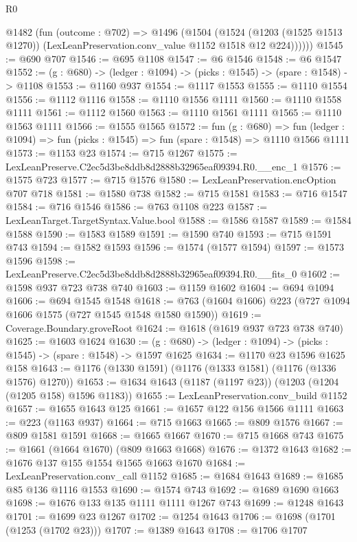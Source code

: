 \begin{lexlean}{R0}
\begin{coremodule}
      @1482
        (fun (outcome : @702) =>
        @1496
          (@1504
            (@1524
              (@1203 (@1525 @1513 @1270))
              (LexLeanPreservation.conv_value @1152 @1518 @12 @224))))))
@1545 := @690 @707
@1546 := @695 @1108
@1547 := @6 @1546
@1548 := @6 @1547
@1552 := (g : @680) -> (ledger : @1094) -> (picks : @1545) -> (spare : @1548) -> @1108
@1553 := @1160 @937
@1554 := @1117 @1553
@1555 := @1110 @1554
@1556 := @1112 @1116
@1558 := @1110 @1556 @1111
@1560 := @1110 @1558 @1111
@1561 := @1112 @1560
@1563 := @1110 @1561 @1111
@1565 := @1110 @1563 @1111
@1566 := @1555 @1565
@1572 := fun (g : @680) =>
  fun (ledger : @1094) => fun (picks : @1545) => fun (spare : @1548) => @1110 @1566 @1111
@1573 := @1153 @23
@1574 := @715 @1267
@1575 := LexLeanPreserve.C2ec5d3be8ddb8d2888b32965eaf09394.R0.__enc_1
@1576 := @1575 @723
@1577 := @715 @1576
@1580 := LexLeanPreservation.encOption @707 @718
@1581 := @1580 @738
@1582 := @715 @1581
@1583 := @716 @1547
@1584 := @716 @1546
@1586 := @763 @1108 @223
@1587 := LexLeanTarget.TargetSyntax.Value.bool
@1588 := @1586 @1587
@1589 := @1584 @1588
@1590 := @1583 @1589
@1591 := @1590 @740
@1593 := @715 @1591 @743
@1594 := @1582 @1593
@1596 := @1574 (@1577 @1594)
@1597 := @1573 @1596
@1598 := LexLeanPreserve.C2ec5d3be8ddb8d2888b32965eaf09394.R0.__fits_0
@1602 := @1598 @937 @723 @738 @740
@1603 := @1159 @1602
@1604 := @694 @1094
@1606 := @694 @1545 @1548
@1618 := @763 (@1604 @1606) @223 (@727 @1094 @1606 @1575 (@727 @1545 @1548 @1580 @1590))
@1619 := Coverage.Boundary.groveRoot
@1624 := @1618 (@1619 @937 @723 @738 @740)
@1625 := @1603 @1624
@1630 := (g : @680) -> (ledger : @1094) -> (picks : @1545) -> (spare : @1548) -> @1597 @1625
@1634 := @1170 @23 @1596 @1625 @158
@1643 := @1176 (@1330 @1591) (@1176 (@1333 @1581) (@1176 (@1336 @1576) @1270))
@1653 := @1634 @1643 (@1187 (@1197 @23)) (@1203 (@1204 (@1205 @158) @1596 @1183))
@1655 := LexLeanPreservation.conv_build @1152
@1657 := @1655 @1643 @125
@1661 := @1657 @122 @156 @1566 @1111
@1663 := @223 (@1163 @937)
@1664 := @715 @1663
@1665 := @809 @1576
@1667 := @809 @1581 @1591
@1668 := @1665 @1667
@1670 := @715 @1668 @743
@1675 := @1661 (@1664 @1670) (@809 @1663 @1668)
@1676 := @1372 @1643
@1682 := @1676 @137 @155 @1554 @1565 @1663 @1670
@1684 := LexLeanPreservation.conv_call @1152
@1685 := @1684 @1643
@1689 := @1685 @85 @136 @1116 @1553
@1690 := @1574 @743
@1692 := @1689 @1690 @1663
@1698 := @1676 @133 @135 @1111 @1111 @1267 @743
@1699 := @1248 @1643
@1701 := @1699 @23 @1267
@1702 := @1254 @1643
@1706 := @1698 (@1701 (@1253 (@1702 @23)))
@1707 := @1389 @1643
@1708 := @1706 @1707

\end{coremodule}
\end{lexlean}
